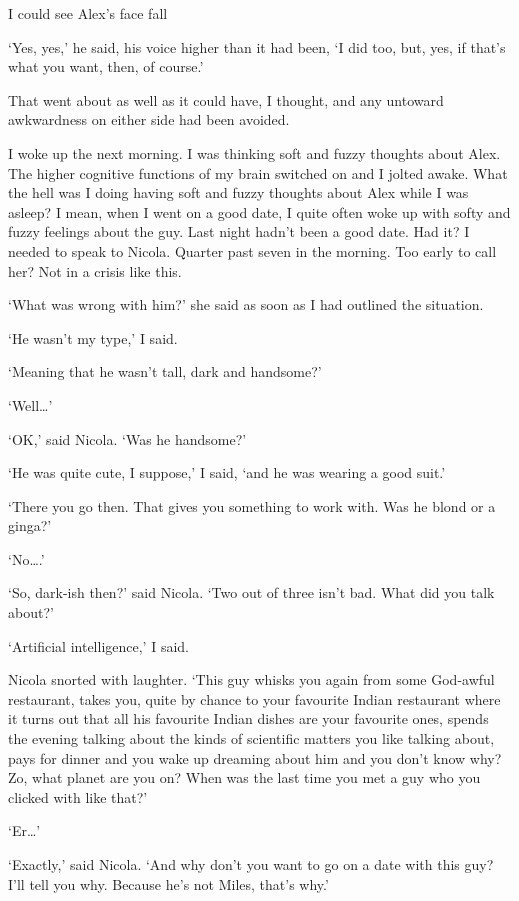 I could see Alex's face fall

`Yes, yes,' he said, his voice higher than it had been, `I did too, but, yes, if that's what you want, then, of course.'

That went about as well as it could have, I thought, and any untoward awkwardness on either side had been avoided.

I woke up the next morning. I was thinking soft and fuzzy thoughts
about Alex. The higher cognitive functions of my brain switched on
and I jolted awake. What the hell was I doing having soft and fuzzy
thoughts about Alex while I was asleep? I mean, when I went on a
good date, I quite often woke up with softy and fuzzy feelings about
the guy. Last night hadn't been a good date. Had it? I needed to
speak to Nicola. Quarter past seven in the morning. Too early to
call her? Not in a crisis like this.

`What was wrong with him?' she said as soon as I had
outlined the situation.

`He wasn't my type,' I said.

`Meaning that he wasn't tall, dark and handsome?'

`Well\dots'

`OK,' said Nicola. `Was he handsome?'

`He was quite cute, I suppose,' I said, `and he was wearing a good
suit.'

`There you go then. That gives you something to work with. Was he
blond or a ginga?'

`No\dots.'

`So, dark-ish then?' said Nicola. `Two out of three isn't bad. What did you talk about?'

`Artificial intelligence,' I said.

Nicola snorted with laughter. `This guy whisks you again from some
God-awful restaurant, takes you, quite by chance to your favourite
Indian restaurant where it turns out that all his favourite Indian dishes
are your favourite ones, spends the evening talking about the kinds
of scientific matters you like talking about, pays for dinner and
you wake up dreaming about him and you don't know why? Zo, what
planet are you on? When was the last time you met a guy who you clicked with like that?'

`Er\dots'

`Exactly,' said Nicola. `And why don't you want to go on a date with this guy? I'll
tell you why. Because he's not Miles, that's why.'

